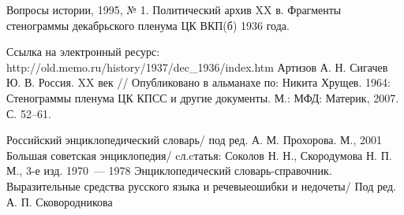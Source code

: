 Вопросы истории, 1995, № 1. Политический архив XX в. Фрагменты стенограммы декабрьского пленума ЦК ВКП(б) 1936 года.\par Ссылка на электронный ресурс: http://old.memo.ru/history/1937/dec\_1936/index.htm
Артизов А. Н. Сигачев Ю. В. Россия. XX век // Опубликовано в альманахе по: Никита Хрущев. 1964: Стенограммы пленума ЦК КПСС и другие документы. М.: МФД: Материк, 2007. С. 52–61.

Российский энциклопедический словарь/ под ред. А. М. Прохорова. М., 2001 
Большая советская энциклопедия/ cл.cтатья: Соколов Н. Н., Скородумова Н. П. М., 3-е изд. 1970~--- 1978
Энциклопедический словарь-справочник. Выразительные средства русского языка и речевыеошибки и недочеты/ Под ред. А. П. Сковородникова